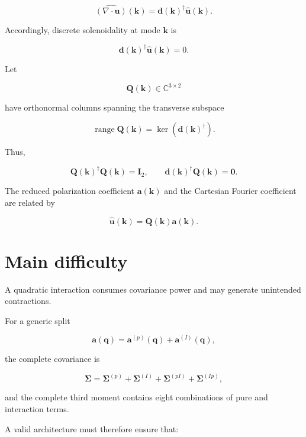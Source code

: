 \documentclass[
  11pt,
  a4paper,
]{article}
\begin{document}
\begin{equation}
\widehat{(\nabla\cdot\boldsymbol u)}(\boldsymbol k)
=
\boldsymbol d(\boldsymbol k)^\dagger
\widehat{\boldsymbol u}(\boldsymbol k).
\label{eq:discrete-divergence-symbol}
\end{equation}

Accordingly, discrete solenoidality at mode \(\boldsymbol k\) is

\[
\boldsymbol d(\boldsymbol k)^\dagger
\widehat{\boldsymbol u}(\boldsymbol k)
=
0.
\]

Let

\[
\boldsymbol Q(\boldsymbol k)\in\mathbb C^{3\times2}
\]

have orthonormal columns spanning the transverse subspace

\[
\operatorname{range}\boldsymbol Q(\boldsymbol k)
=
\ker\!\left(\boldsymbol d(\boldsymbol k)^\dagger\right).
\]

Thus,

\[
\boldsymbol Q(\boldsymbol k)^\dagger\boldsymbol Q(\boldsymbol k)
=
\boldsymbol I_2,
\qquad
\boldsymbol d(\boldsymbol k)^\dagger\boldsymbol Q(\boldsymbol k)
=
\boldsymbol0.
\]

The reduced polarization coefficient \(\boldsymbol a(\boldsymbol k)\) and
the Cartesian Fourier coefficient are related by

\[
\widehat{\boldsymbol u}(\boldsymbol k)
=
\boldsymbol Q(\boldsymbol k)\boldsymbol a(\boldsymbol k).
\]

\section{Main difficulty}\label{main-difficulty}

A quadratic interaction consumes covariance power and may generate
unintended contractions.

For a generic split

\[
\boldsymbol a(\boldsymbol q)
=
\boldsymbol a^{(p)}(\boldsymbol q)
+
\boldsymbol a^{(I)}(\boldsymbol q),
\]

the complete covariance is

\[
\boldsymbol\Sigma
=
\boldsymbol\Sigma^{(p)}
+
\boldsymbol\Sigma^{(I)}
+
\boldsymbol\Sigma^{(pI)}
+
\boldsymbol\Sigma^{(Ip)},
\]

and the complete third moment contains eight combinations of pure and
interaction terms.

A valid architecture must therefore ensure that:
\end{document}
